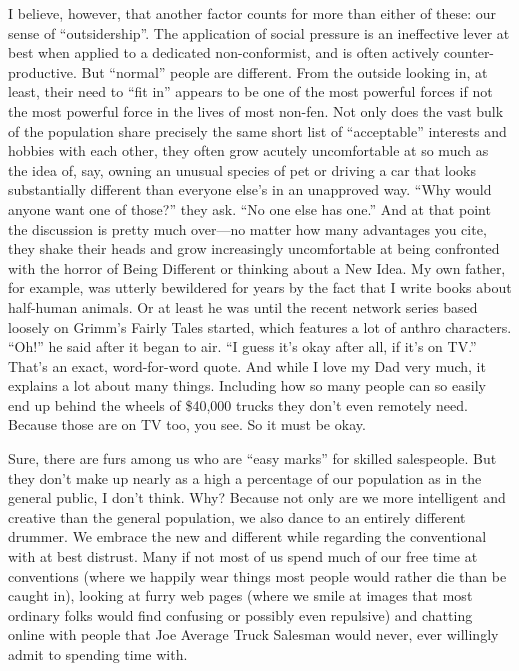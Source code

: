 I believe, however, that another factor counts for more than either of these: our sense of ``outsidership''. The application of social pressure is an ineffective lever at best when applied to a dedicated non-conformist, and is often actively counter-productive. But ``normal'' people are different. From the outside looking in, at least, their need to ``fit in'' appears to be one of the most powerful forces if not the most powerful force in the lives of most non-fen. Not only does the vast bulk of the population share precisely the same short list of ``acceptable'' interests and hobbies with each other, they often grow acutely uncomfortable at so much as the idea of, say, owning an unusual species of pet or driving a car that looks substantially different than everyone else's in an unapproved way. ``Why would anyone want one of those?'' they ask. ``No one else has one.'' And at that point the discussion is pretty much over—no matter how many advantages you cite, they shake their heads and grow increasingly uncomfortable at being confronted with the horror of Being Different or thinking about a New Idea. My own father, for example, was utterly bewildered for years by the fact that I write books about half-human animals. Or at least he was until the recent network series based loosely on Grimm's Fairly Tales started, which features a lot of anthro characters. ``Oh!'' he said after it began to air. ``I guess it's okay after all, if it's on TV.'' That's an exact, word-for-word quote. And while I love my Dad very much, it explains a lot about many things. Including how so many people can so easily end up behind the wheels of \$40,000 trucks they don't even remotely need. Because those are on TV too, you see. So it must be okay.

Sure, there are furs among us who are ``easy marks'' for skilled salespeople. But they don't make up nearly as a high a percentage of our population as in the general public, I don't think. Why? Because not only are we more intelligent and creative than the general population, we also dance to an entirely different drummer. We embrace the new and different while regarding the conventional with at best distrust. Many if not most of us spend much of our free time at conventions (where we happily wear things most people would rather die than be caught in), looking at furry web pages (where we smile at images that most ordinary folks would find confusing or possibly even repulsive) and chatting online with people that Joe Average Truck Salesman would never, ever willingly admit to spending time with.

